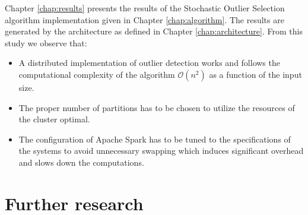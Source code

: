 Chapter \ref{chap:results} presents the results of the Stochastic Outlier Selection algorithm implementation given in Chapter \ref{chap:algorithm}. The results are generated by the architecture as defined in Chapter \ref{chap:architecture}. From this study we observe that:

\begin{itemize} 
    \item A distributed implementation of outlier detection works and follows the computational complexity of the algorithm $\mathcal{O}(n^{2})$ as a function of the input size.
    \item The proper number of partitions has to be chosen to utilize the resources of the cluster optimal. 
    \item The configuration of Apache Spark has to be tuned to the specifications of the systems to avoid unnecessary swapping which induces significant overhead and slows down the computations.
\end{itemize}

\section{Further research \label{sec:futherResearch}}




